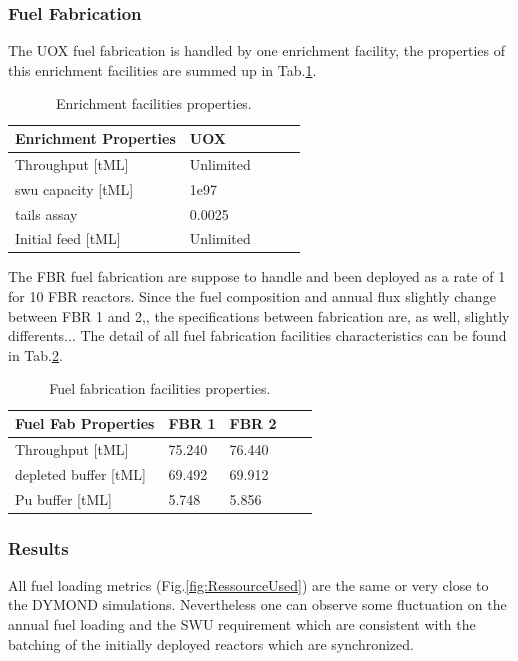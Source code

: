 \documentclass[12pt]{article}
\begin{document}
\subsubsection{Fuel Fabrication}
The UOX fuel fabrication is handled by one
enrichment facility, the properties of this
enrichment facilities are summed up in
Tab.\ref{tab:enrich_1}.

\begin{table}[h!]
\centering
\begin{tabular}{lllll}
\hline
Enrichment Properties	&	UOX		\\
\hline
Throughput [tML]		&	Unlimited	\\
swu capacity [tML]		&	1e97		\\
tails assay  			&	0.0025	\\
Initial feed [tML]		&	Unlimited	\\
\hline
\end{tabular}
\caption{Enrichment facilities properties. }
\label{tab:enrich_1}
\end{table}

The FBR fuel fabrication are suppose to handle and
been deployed as a rate of 1 for 10 FBR reactors.
Since the fuel composition and annual flux
slightly change between FBR 1 and 2,, the
specifications between fabrication are, as well,
slightly differents... The detail of all fuel
fabrication facilities characteristics can be
found in Tab.\ref{tab:fuelfab_1}.

\begin{table}[h!]
\centering
\begin{tabular}{lllll}
\hline
Fuel Fab Properties	&	FBR 1	&	FBR 2	\\
\hline
Throughput [tML]	&	75.240	&	76.440	\\
depleted buffer [tML]	&	69.492	&	69.912	\\
Pu buffer  [tML]		&	5.748	&	5.856	\\
\hline
\end{tabular}
\caption{Fuel fabrication facilities properties.}
\label{tab:fuelfab_1}
\end{table}


\subsubsection{Results}
All fuel loading metrics
(Fig.\ref{fig:RessourceUsed}) are the same or very
close to the DYMOND simulations. Nevertheless one
can observe some fluctuation on the annual fuel
loading and the SWU requirement which are
consistent with the batching of the initially
deployed reactors which are synchronized.
\end{document}
